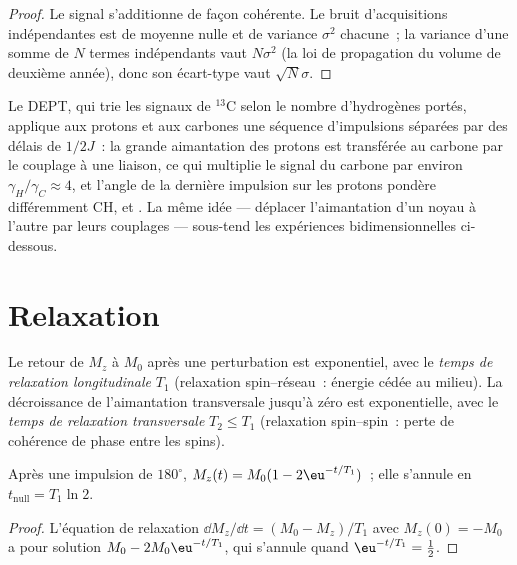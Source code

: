 \begin{proof}
Le signal s'additionne de façon cohérente. Le bruit d'acquisitions
indépendantes est de moyenne nulle et de variance $\sigma^2$ chacune~; la
variance d'une somme de $N$ termes indépendants vaut
$N\sigma^2$ (la loi de propagation du volume de deuxième année), donc son
écart-type vaut $\sqrt N\sigma$.
\end{proof}

Le DEPT, qui trie les signaux de ${}^{13}$C selon le nombre d'hydrogènes
portés, applique aux protons et aux carbones une séquence d'impulsions
séparées par des délais de $1/2J$~: la grande aimantation des protons est
transférée au carbone par le couplage à une liaison, ce qui multiplie le
signal du carbone par environ
$\gamma_H/\gamma_C \approx 4$, et l'angle de la dernière impulsion sur
les protons pondère différemment CH,  et
. La même idée --- déplacer l'aimantation d'un noyau à l'autre par
leurs couplages --- sous-tend les expériences bidimensionnelles
ci-dessous.

\section{Relaxation}

\begin{definition}\label{def:b3:advanced-nmr:relaxation}
Le retour de $M_z$ à $M_0$ après une perturbation est exponentiel, avec
le \emph{temps de relaxation longitudinale} $T_1$
(relaxation spin--réseau~: énergie cédée au milieu). La décroissance de
l'aimantation transversale jusqu'à zéro est exponentielle, avec le
\emph{temps de relaxation transversale} $T_2 \le T_1$
(relaxation spin--spin~: perte de cohérence de phase entre les spins).
\end{definition}

\begin{proposition}\label{prop:b3:advanced-nmr:inversion-recovery}
Après une impulsion de $180^\circ$, $M_z(t) = M_0(1 - 2\eu^{-t/T_1})$~;
elle s'annule en
$t_{\mathrm{null}} = T_1\ln2$.
\end{proposition}

\begin{proof}
L'équation de relaxation $\dd M_z/\dd t = (M_0 - M_z)/T_1$ avec $M_z(0) = -M_0$ a pour
solution $M_0 - 2M_0\eu^{-t/T_1}$, qui s'annule quand $\eu^{-t/T_1} = \frac12$.
\end{proof}

